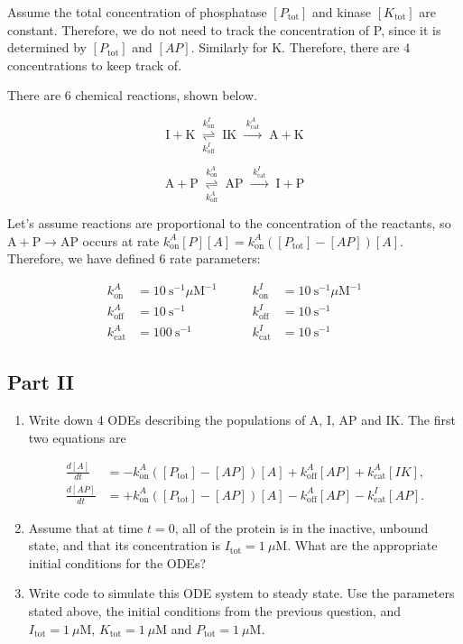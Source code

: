 \documentclass[
  letterpaper,
  DIV=11,
  numbers=noendperiod]{scrartcl}
\begin{document}
Assume the total concentration of phosphatase \([P_\mathrm{tot}]\) and
kinase \([K_\mathrm{tot}]\) are constant. Therefore, we do not need to
track the concentration of P, since it is determined by
\([P_\mathrm{tot}]\) and \([AP]\). Similarly for K. Therefore, there are
4 concentrations to keep track of.

There are 6 chemical reactions, shown below.

\[
\mathrm{I} + \mathrm{K}
\;\underset{k^I_\mathrm{off}}{\overset{k^I_\mathrm{on}}{\rightleftharpoons}}\;
\mathrm{IK}
\;\xrightarrow{\;k^A_\mathrm{cat}\;}\;
\mathrm{A} + \mathrm{K}
\]

\[
\mathrm{A} + \mathrm{P}
\;\underset{k^A_\mathrm{off}}{\overset{k^A_\mathrm{on}}{\rightleftharpoons}}\;
\mathrm{AP}
\;\xrightarrow{\;k^I_\mathrm{cat}\;}\;
\mathrm{I} + \mathrm{P}
\]

Let's assume reactions are proportional to the concentration of the
reactants, so \(\mathrm{A}+\mathrm{P} \rightarrow \mathrm{AP}\) occurs
at rate
\(k^A_\mathrm{on} [P] [A] = k^A_\mathrm{on} ([P_\mathrm{tot}] - [AP]) [A]\).
Therefore, we have defined 6 rate parameters:

\[
\begin{aligned}
k^A_\mathrm{on} &= 10 \ \mathrm{s}^{-1}\mu\mathrm{M}^{-1} & \qquad k^I_\mathrm{on} &= 10 \ \mathrm{s}^{-1}\mu\mathrm{M}^{-1}\\
k^A_\mathrm{off} &= 10 \ \mathrm{s}^{-1} & \qquad k^I_\mathrm{off} &= 10 \ \mathrm{s}^{-1}\\
k^A_\mathrm{cat} &= 100 \ \mathrm{s}^{-1} & \qquad k^I_\mathrm{cat} &= 10 \ \mathrm{s}^{-1}
\end{aligned}
\]

\subsection{Part II}\label{part-ii}

\begin{enumerate}
\def\labelenumi{\alph{enumi}.}
\setcounter{enumi}{1}
\item
  Write down 4 ODEs describing the populations of A, I, AP and IK. The
  first two equations are

  \[
   \begin{aligned}
   \frac{d[A]}{dt} &= -k^A_\mathrm{on} \left( [P_\mathrm{tot}] - [AP]\right) [A] + k^A_\mathrm{off} [AP] + k^A_\mathrm{cat} [IK],\\
   \frac{d[AP]}{dt} &= +k^A_\mathrm{on} \left( [P_\mathrm{tot}] - [AP]\right) [A] - k^A_\mathrm{off} [AP] - k^I_\mathrm{cat} [AP].
   \end{aligned}
   \]
\item
  Assume that at time \(t=0\), all of the protein is in the inactive,
  unbound state, and that its concentration is
  \(I_\mathrm{tot}=1~\mu\mathrm{M}\). What are the appropriate initial
  conditions for the ODEs?
\item
  Write code to simulate this ODE system to steady state. Use the
  parameters stated above, the initial conditions from the previous
  question, and \(I_\mathrm{tot}=1~\mu\mathrm{M}\),
  \(K_\mathrm{tot}=1~\mu\mathrm{M}\) and
  \(P_\mathrm{tot}=1~\mu\mathrm{M}\).
\end{enumerate}
\end{document}
